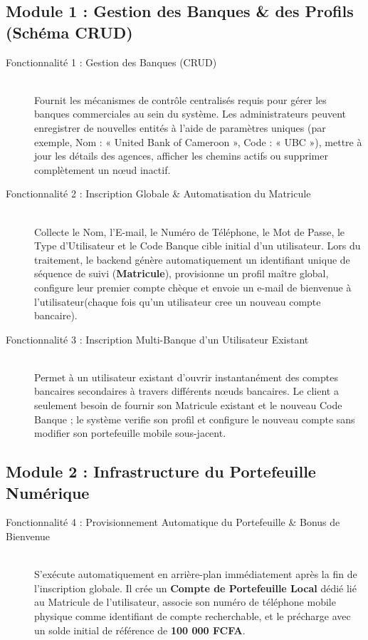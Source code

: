 \documentclass[12pt,a4paper]{article}
\begin{document}
	\subsection{Module 1 : Gestion des Banques \& des Profils (Schéma CRUD)}
	\begin{description}
		\item[Fonctionnalité 1 : Gestion des Banques (CRUD)] ~\\
		Fournit les mécanismes de contrôle centralisés requis pour gérer les banques commerciales au sein du système. Les administrateurs peuvent enregistrer de nouvelles entités à l'aide de paramètres uniques (par exemple, Nom : « United Bank of Cameroon », Code : « UBC »), mettre à jour les détails des agences, afficher les chemins actifs ou supprimer complètement un nœud inactif.
		
		\item[Fonctionnalité 2 : Inscription Globale \& Automatisation du Matricule] ~\\
		Collecte le Nom, l'E-mail, le Numéro de Téléphone, le Mot de Passe, le Type d'Utilisateur et le Code Banque cible initial d'un utilisateur. Lors du traitement, le backend génère automatiquement un identifiant unique de séquence de suivi (\textbf{Matricule}), provisionne un profil maître global, configure leur premier compte chèque et envoie un e-mail de bienvenue à l'utilisateur(chaque fois qu'un utilisateur cree un nouveau compte bancaire).
		
		\item[Fonctionnalité 3 : Inscription Multi-Banque d'un Utilisateur Existant] ~\\
		Permet à un utilisateur existant d'ouvrir instantanément des comptes bancaires secondaires à travers différents nœuds bancaires. Le client a seulement besoin de fournir son Matricule existant et le nouveau Code Banque ; le système verifie son profil et configure le nouveau compte sans modifier son portefeuille mobile sous-jacent.
	\end{description}
	
	\subsection{Module 2 : Infrastructure du Portefeuille Numérique}
	\begin{description}
		\item[Fonctionnalité 4 : Provisionnement Automatique du Portefeuille \& Bonus de Bienvenue] ~\\
		S'exécute automatiquement en arrière-plan immédiatement après la fin de l'inscription globale. Il crée un \textbf{Compte de Portefeuille Local} dédié lié au Matricule de l'utilisateur, associe son numéro de téléphone mobile physique comme identifiant de compte recherchable, et le précharge avec un solde initial de référence de \textbf{100 000 FCFA}.
	\end{description}
	
\end{document}
